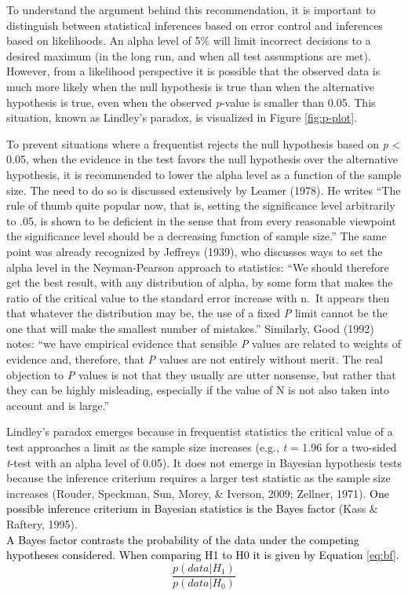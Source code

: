 \documentclass[
  english,
  ,man, a4paper,floatsintext]{apa6}
\begin{document}
To understand the argument behind this recommendation, it is important to distinguish between statistical inferences based on error control and inferences based on likelihoods. An alpha level of 5\% will limit incorrect decisions to a desired maximum (in the long run, and when all test assumptions are met). However, from a likelihood perspective it is possible that the observed data is much more likely when the null hypothesis is true than when the alternative hypothesis is true, even when the observed \emph{p}-value is smaller than 0.05. This situation, known as Lindley's paradox, is visualized in Figure \ref{fig:p-plot}.

To prevent situations where a frequentist rejects the null hypothesis based on \emph{p} \textless{} 0.05, when the evidence in the test favors the null hypothesis over the alternative hypothesis, it is recommended to lower the alpha level as a function of the sample size. The need to do so is discussed extensively by Leamer (1978). He writes ``The rule of thumb quite popular now, that is, setting the significance level arbitrarily to .05, is shown to be deficient in the sense that from every reasonable viewpoint the significance level should be a decreasing function of sample size.'' The same point was already recognized by Jeffreys (1939), who discusses ways to set the alpha level in the Neyman-Pearson approach to statistics: ``We should therefore get the best result, with any distribution of alpha, by some form that makes the ratio of the critical value to the standard error increase with n.~It appears then that whatever the distribution may be, the use of a fixed \emph{P} limit cannot be the one that will make the smallest number of mistakes.'' Similarly, Good (1992) notes: ``we have empirical evidence that sensible \emph{P} values are related to weights of evidence and, therefore, that \emph{P} values are not entirely without merit. The real objection to \emph{P} values is not that they usually are utter nonsense, but rather that they can be highly misleading, especially if the value of N is not also taken into account and is large.''

Lindley's paradox emerges because in frequentist statistics the critical value of a test approaches a limit as the sample size increases (e.g., \emph{t} = 1.96 for a two-sided \emph{t}-test with an alpha level of 0.05). It does not emerge in Bayesian hypothesis tests because the inference criterium requires a larger test statistic as the sample size increases (Rouder, Speckman, Sun, Morey, \& Iverson, 2009; Zellner, 1971). \textcolor{black}{One possible inference criterium in Bayesian statistics is the Bayes factor} (Kass \& Raftery, 1995).\\
\textcolor{black}{A Bayes factor contrasts the probability of the data under the competing hypotheses considered. When comparing H1 to H0 it is given by Equation \ref{eq:bf}.}
\begin{equation}
\frac{p(data|H_1)}{p(data|H_0)}
\label{eq:bf}
\end{equation}
\end{document}
